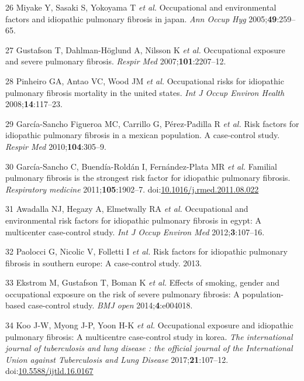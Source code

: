 \documentclass[12pt,a4paper,]{report}
\begin{document}
\leavevmode\hypertarget{ref-Miyake2005}{}%
26 Miyake Y, Sasaki S, Yokoyama T \emph{et al.} Occupational and
environmental factors and idiopathic pulmonary fibrosis in japan.
\emph{Ann Occup Hyg} 2005;\textbf{49}:259--65.

\leavevmode\hypertarget{ref-Gustafson2007}{}%
27 Gustafson T, Dahlman-Höglund A, Nilsson K \emph{et al.} Occupational
exposure and severe pulmonary fibrosis. \emph{Respir Med}
2007;\textbf{101}:2207--12.

\leavevmode\hypertarget{ref-Pinheiro2008}{}%
28 Pinheiro GA, Antao VC, Wood JM \emph{et al.} Occupational risks for
idiopathic pulmonary fibrosis mortality in the united states. \emph{Int
J Occup Environ Health} 2008;\textbf{14}:117--23.

\leavevmode\hypertarget{ref-Garcia-SanchoFigueroa2010}{}%
29 García-Sancho Figueroa MC, Carrillo G, Pérez-Padilla R \emph{et al.}
Risk factors for idiopathic pulmonary fibrosis in a mexican population.
A case-control study. \emph{Respir Med} 2010;\textbf{104}:305--9.

\leavevmode\hypertarget{ref-Garcia-Sancho2011}{}%
30 García-Sancho C, Buendía-Roldán I, Fernández-Plata MR \emph{et al.}
Familial pulmonary fibrosis is the strongest risk factor for idiopathic
pulmonary fibrosis. \emph{Respiratory medicine}
2011;\textbf{105}:1902--7.
doi:\href{https://doi.org/10.1016/j.rmed.2011.08.022}{10.1016/j.rmed.2011.08.022}

\leavevmode\hypertarget{ref-Awadalla2012}{}%
31 Awadalla NJ, Hegazy A, Elmetwally RA \emph{et al.} Occupational and
environmental risk factors for idiopathic pulmonary fibrosis in egypt: A
multicenter case-control study. \emph{Int J Occup Environ Med}
2012;\textbf{3}:107--16.

\leavevmode\hypertarget{ref-Paolocci2013}{}%
32 Paolocci G, Nicolic V, Folletti I \emph{et al.} Risk factors for
idiopathic pulmonary fibrosis in southern europe: A case-control study.
2013.

\leavevmode\hypertarget{ref-Ekstrom2014}{}%
33 Ekstrom M, Gustafson T, Boman K \emph{et al.} Effects of smoking,
gender and occupational exposure on the risk of severe pulmonary
fibrosis: A population-based case-control study. \emph{BMJ open}
2014;\textbf{4}:e004018.

\leavevmode\hypertarget{ref-Koo2017}{}%
34 Koo J-W, Myong J-P, Yoon H-K \emph{et al.} Occupational exposure and
idiopathic pulmonary fibrosis: A multicentre case-control study in
korea. \emph{The international journal of tuberculosis and lung disease
: the official journal of the International Union against Tuberculosis
and Lung Disease} 2017;\textbf{21}:107--12.
doi:\href{https://doi.org/10.5588/ijtld.16.0167}{10.5588/ijtld.16.0167}
\end{document}
